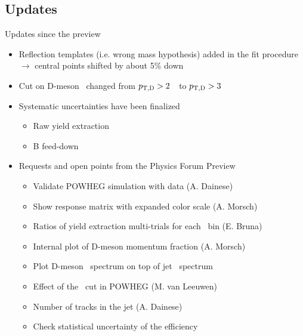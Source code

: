 \documentclass[xcolor={usenames,dvipsnames}]{beamer}
\begin{document}
\subsection{Updates}

\begin{frame}{Updates since the preview}

{\small
\begin{itemize}
\item Reflection templates (i.e. wrong mass hypothesis) added in the fit procedure $\rightarrow$ central points shifted by about 5\% down
\item Cut on D-meson \pt\ changed from $p_{\mathrm{T,D}}>2$~\GeVc\ to $p_{\mathrm{T,D}}>3$~\GeVc\
\item Systematic uncertainties have been finalized
\begin{itemize}
\item Raw yield extraction
\item B feed-down
\end{itemize}
\item Requests and open points from the Physics Forum Preview
\begin{itemize}
\item Validate POWHEG simulation with data (A. Dainese)
\item Show response matrix with expanded color scale (A. Morsch)
\item Ratios of yield extraction multi-trials for each \ptd\ bin (E. Bruna)
\item Internal plot of D-meson momentum fraction (A. Morsch)
\item Plot D-meson \pt\ spectrum on top of jet \pt\ spectrum
\item Effect of the \ptd\ cut in POWHEG (M. van Leeuwen)
\item Number of tracks in the jet (A. Dainese)
\item Check statistical uncertainty of the efficiency
\end{itemize}
\end{itemize}
}
\end{frame}
\end{document}
